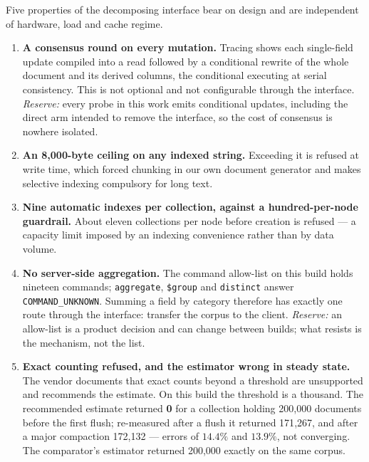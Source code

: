 \documentclass[11pt,a4paper]{article}
\newcommand{\code}[1]{\texttt{\small #1}}
\begin{document}
Five properties of the decomposing interface bear on design and are independent of hardware, load
and cache regime.

\begin{enumerate}
\item \textbf{A consensus round on every mutation.} Tracing shows each single-field update compiled
into a read followed by a conditional rewrite of the whole document and its derived columns, the
conditional executing at serial consistency. This is not optional and not configurable through the
interface. \emph{Reserve:} every probe in this work emits conditional updates, including the direct
arm intended to remove the interface, so the cost of consensus is nowhere isolated.

\item \textbf{An 8{,}000-byte ceiling on any indexed string.} Exceeding it is refused at write time,
which forced chunking in our own document generator and makes selective indexing compulsory for
long text.

\item \textbf{Nine automatic indexes per collection, against a hundred-per-node guardrail.} About
eleven collections per node before creation is refused --- a capacity limit imposed by an indexing
convenience rather than by data volume.

\item \textbf{No server-side aggregation.} The command allow-list on this build holds nineteen
commands; \code{aggregate}, \code{\$group} and \code{distinct} answer \code{COMMAND\_UNKNOWN}.
Summing a field by category therefore has exactly one route through the interface: transfer the
corpus to the client. \emph{Reserve:} an allow-list is a product decision and can change between
builds; what resists is the mechanism, not the list.

\item \textbf{Exact counting refused, and the estimator wrong in steady state.} The vendor documents
that exact counts beyond a threshold are unsupported and recommends the estimate. On this build the
threshold is a thousand. The recommended estimate returned \textbf{0} for a collection holding
200{,}000 documents before the first flush; re-measured after a flush it returned 171{,}267, and
after a major compaction 172{,}132 --- errors of $14.4\%$ and $13.9\%$, not converging. The
comparator's estimator returned 200{,}000 exactly on the same corpus.
\end{enumerate}
\end{document}
